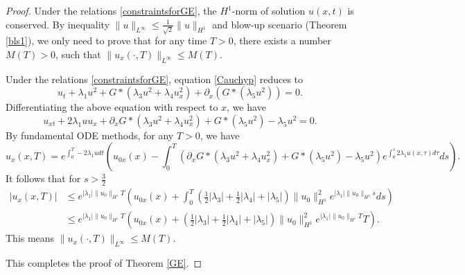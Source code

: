 \documentclass[11pt]{article}
\begin{document}
\begin{proof}
Under the relations \eqref{constraintsforGE}, the $H^1$-norm of solution $u(x,t)$ is conserved. 
By inequality $\|u\|_{L^\infty}\leq \frac{1}{\sqrt{2}}\|u\|_{H^1}$
and blow-up scenario (Theorem \ref{bls1}), we only need to prove that for any time $T>0$, there exists a number $M(T)>0$, such that $\|u_x(\cdot,T)\|_{L^\infty}\leq M(T)$.

Under the relations \eqref{constraintsforGE}, equation \eqref{Cauchyp} reduces to
\begin{equation*}
u_t + \lambda_1 u^2  + G\ast(\lambda_3 u^2 + \lambda_4 u_x^2) + \partial_x \left(  G \ast (\lambda_5 u^2 ) \right) = 0.
\end{equation*}
Differentiating the above equation with respect to $x$, we have
\begin{equation*}
u_{xt} + 2\lambda_1 uu_x  +\partial_xG\ast(\lambda_3 u^2 + \lambda_4 u_x^2) +  G \ast (\lambda_5 u^2 ) -\lambda_5 u^2 = 0.
\end{equation*}
By fundamental ODE methods, for any $T>0$, we have
\begin{equation*}
u_{x}(x,T) =e^{\int_0^T-2\lambda_1 udt}\left(u_{0x}(x)
-\int_0^T\left(\partial_xG\ast(\lambda_3 u^2 + \lambda_4 u_x^2) +  G \ast (\lambda_5 u^2 ) -\lambda_5 u^2 \right)
e^{\int_0^s2\lambda_1 u(x,\tau)d\tau}ds\right).
\end{equation*}
It follows that for $s>\tfrac{3}{2}$
\begin{equation*}
\begin{aligned}
|u_{x}(x,T)| &\leq e^{|\lambda_1| \|u_0\|_{H^1}T}\left(u_{0x}(x)+
\int_{0}^{T}\left(\frac{1}{2}|\lambda_3|+\frac{1}{2}|\lambda_4|+|\lambda_5|\right)
\|u_0\|_{H^1}^2e^{|\lambda_1| \|u_0\|_{H^1}s}ds\right)\\
& \leq e^{|\lambda_1| \|u_0\|_{H^1}T}\left(u_{0x}(x)+
\left(\frac{1}{2}|\lambda_3|+\frac{1}{2}|\lambda_4|+|\lambda_5|\right)
\|u_0\|_{H^1}^2e^{|\lambda_1| \|u_0\|_{H^1}T}T\right).
\end{aligned}
\end{equation*}
This means $\|u_x(\cdot,T)\|_{L^\infty}\leq M(T)$.

This completes the proof of Theorem \ref{GE}.
\end{proof}
\end{document}
